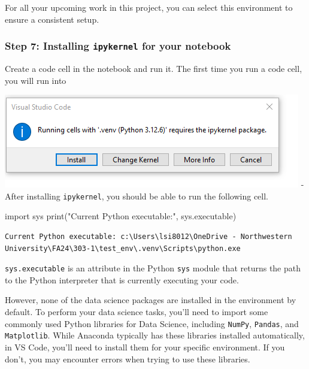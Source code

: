 \documentclass[
  letterpaper,
  DIV=11,
  numbers=noendperiod]{scrreprt}
\newenvironment{Shaded}{\begin{snugshade}}{\end{snugshade}}
\newcommand{\BuiltInTok}[1]{\textcolor[rgb]{0.00,0.23,0.31}{#1}}
\newcommand{\ImportTok}[1]{\textcolor[rgb]{0.00,0.46,0.62}{#1}}
\newcommand{\NormalTok}[1]{\textcolor[rgb]{0.00,0.23,0.31}{#1}}
\newcommand{\StringTok}[1]{\textcolor[rgb]{0.13,0.47,0.30}{#1}}
\begin{document}
For all your upcoming work in this project, you can select this
environment to ensure a consistent setup.

\hypertarget{step-7-installing-ipykernel-for-your-notebook}{%
\subsubsection{\texorpdfstring{Step 7: Installing \texttt{ipykernel} for
your
notebook}{Step 7: Installing ipykernel for your notebook}}\label{step-7-installing-ipykernel-for-your-notebook}}

Create a code cell in the notebook and run it. The first time you run a
code cell, you will run into

\includegraphics{images/ipykernel.png} - After installing
\texttt{ipykernel}, you should be able to run the following cell.

\begin{Shaded}
\begin{Highlighting}[]
\ImportTok{import}\NormalTok{ sys}
\BuiltInTok{print}\NormalTok{(}\StringTok{"Current Python executable:"}\NormalTok{, sys.executable)}
\end{Highlighting}
\end{Shaded}

\begin{verbatim}
Current Python executable: c:\Users\lsi8012\OneDrive - Northwestern University\FA24\303-1\test_env\.venv\Scripts\python.exe
\end{verbatim}

\texttt{sys.executable} is an attribute in the Python \texttt{sys}
module that returns the path to the Python interpreter that is currently
executing your code.

However, none of the data science packages are installed in the
environment by default. To perform your data science tasks, you'll need
to import some commonly used Python libraries for Data Science,
including \texttt{NumPy}, \texttt{Pandas}, and \texttt{Matplotlib}.
While Anaconda typically has these libraries installed automatically, in
VS Code, you'll need to install them for your specific environment. If
you don't, you may encounter errors when trying to use these libraries.
\end{document}
